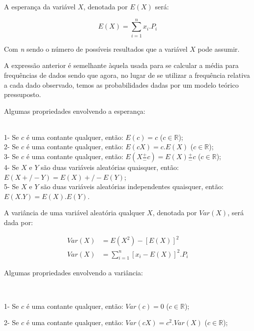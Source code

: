 \documentclass[
]{book}
\begin{document}
\hfill\break

A esperança da variável \(X\), denotada por \(E(X)\) será:

\hfill\break

\[
E\left(X\right)=\sum _{i=1}^{n}{x}_{i}.{P}_{i}
\]

\hfill\break

Com \emph{n} sendo o número de possíveis resultados que a variável \(X\) pode assumir.

\hfill\break

A expressão anterior é semelhante àquela usada para se calcular a média para frequências de dados sendo que agora, no lugar de se utilizar a frequência relativa a cada dado observado, temos as probabilidades dadas por um modelo teórico pressuposto.

\hfill\break

Algumas propriedades envolvendo a esperança:

~\\
1- Se \(c\) é uma contante qualquer, então: \(E(c) = c\) (\(c \in \mathbb{R}\));\\
2- Se \(c\) é uma contante qualquer, então: \(E(c X) = c . E(X)\) (\(c \in \mathbb{R}\));\\
3- Se \(c\) é uma contante qualquer, então: \(E(X \frac{+}{-} c) = E(X) \frac{+}{-} c\) (\(c \in \mathbb{R}\));\\
4- Se \(X\) e \(Y\) são duas variáveis aleatórias quaisquer, então: \(E(X +/- Y) = E(X) +/- E(Y)\);\\
5- Se \(X\) e \(Y\) são duas variáveis aleatórias independentes quaisquer, então: \(E(X . Y) = E(X). E(Y)\).

\hfill\break

A variância de uma variável aleatória qualquer \(X\), denotada por \(Var(X)\), será dada por:

\hfill\break

\begin{align*}
Var\left(X\right) & = E(X^{2}) - [E(X)]^{2} \\
Var\left(X\right) & = \sum_{i=1}^{n} [{x}_{i} - E(X)]^{2}.{P}_{i} 
\end{align*}

\hfill\break

Algumas propriedades envolvendo a variância:

~

1- Se \(c\) é uma contante qualquer, então: \(Var(c)=0\) (\(c\in\mathbb{R}\));

2- Se \(c\) é uma contante qualquer, então: \(Var(cX)=c^{2}.Var(X)\) (\(c\in\mathbb{R}\));
\end{document}
